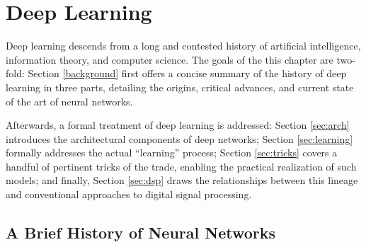 

\graphicspath{{3/figures/}}

\chapter{Deep Learning}
\label{chp:background}



Deep learning descends from a long and contested history of artificial intelligence, information theory, and computer science.
The goals of the this chapter are two-fold:
Section \ref{background} first offers a concise summary of the history of deep learning in three parts, detailing the origins, critical advances, and current state of the art of neural networks.

Afterwards, a formal treatment of deep learning is addressed:
Section \ref{sec:arch} introduces the architectural components of deep networks;
Section \ref{sec:learning} formally addresses the actual ``learning'' process;
Section \ref{sec:tricks} covers a handful of pertinent tricks of the trade, enabling the practical realization of such models;
and finally, Section \ref{sec:dsp} draws the relationships between this lineage and conventional approaches to digital signal processing.


\section{A Brief History of Neural Networks}

